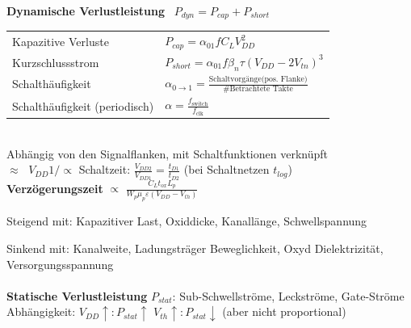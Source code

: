 \documentclass[6pt,a4paper]{scrartcl}
\renewcommand{\emph}[1]{\textsf{\textbf{#1}}}
\begin{document}
\begin{multicols*}{3}
	\emph{Dynamische Verlustleistung} \qquad \ $P_{dyn} = P_{cap} + P_{short}$\\
	\begin{tabular}{ll}
		\quad Kapazitive Verluste \qquad \ \quad \ & $P_{cap} = \alpha_{01} f C_L V_{DD}^2$\\
		\quad Kurzschlussstrom	& $P_{short} = \alpha_{01} f \beta_n \tau (V_{DD} - 2V_{tn})^3$\\[0.8em]
		\quad Schalthäufigkeit & $\alpha_{0 \rightarrow 1} = \frac{\text{Schaltvorgänge(pos. Flanke)}}{\text{\# Betrachtete Takte}}$\\
		\quad Schalthäufigkeit (periodisch) & $\alpha = \frac{f_\text{switch}}{f_\text{clk}}$\\
	\end{tabular}\\
	Abhängig von den Signalflanken, mit Schaltfunktionen verknüpft\\ 
	$\approx \;$ $V_{DD} 1/\propto $ Schaltzeit: $\frac{V_{DD2}}{V_{DD1}} = \frac{t_{D1}}{t_{D2}}$ (bei Schaltnetzen $t_{log}$)\\
	\textbf{Verzögerungszeit} $\propto$ $\frac{C_Lt_{ox}L_p}{W_p\mu_p\varepsilon(V_{DD} - V_{th})}$
	
	Steigend mit: Kapazitiver Last, Oxiddicke, Kanallänge, Schwellspannung
	
	Sinkend mit: Kanalweite, Ladungsträger Beweglichkeit, Oxyd Dielektrizität, Versorgungsspannung \\ \\
	\emph{Statische Verlustleistung} $P_{stat}$: Sub-Schwellströme, Leckströme, Gate-Ströme
	Abhängigkeit: $V_{DD}\uparrow:P_{stat}\uparrow$ \qquad $V_{th}\uparrow:P_{stat}\downarrow$ \quad (aber nicht proportional)


\end{multicols*}
\end{document}

